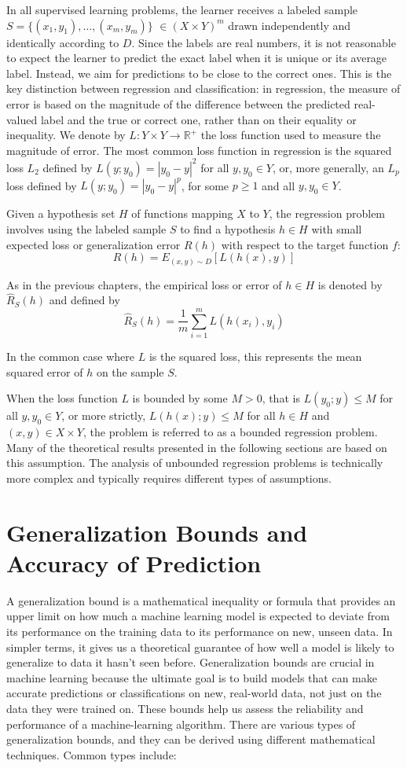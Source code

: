 \documentclass[fleqn,10pt]{olplainarticle}
\begin{document}
In all supervised learning problems, the learner receives a labeled sample $S = \{(x_1, y_1), \ldots, (x_m, y_m)\}$ \( \in (X \times Y)^m \) drawn independently and identically according to $D$. Since the labels are real numbers, it is not reasonable to expect the learner to predict the exact label when it is unique or its average label. Instead, we aim for predictions to be close to the correct ones. This is the key distinction between regression and classification: in regression, the measure of error is based on the magnitude of the difference between the predicted real-valued label and the true or correct one, rather than on their equality or inequality. We denote by $L: Y \times Y \to \mathbb{R}^+$ the loss function used to measure the magnitude of error. The most common loss function in regression is the squared loss $L_2$ defined by $L(y; y_0) = |y_0 - y|^2$ for all $y, y_0 \in Y$, or, more generally, an $L_p$ loss defined by $L(y; y_0) = |y_0 - y|^p$, for some $p \geq 1$ and all $y, y_0 \in Y$.

Given a hypothesis set $H$ of functions mapping $X$ to $Y$, the regression problem involves using the labeled sample $S$ to find a hypothesis $h \in H$ with small expected loss or generalization error $R(h)$ with respect to the target function $f$:
\[R(h) = E_{(x,y) \sim D} \left[L\left(h(x), y\right)\right]\]

As in the previous chapters, the empirical loss or error of $h \in H$ is denoted by $\hat{R}_S(h)$ and defined by
\[\hat{R}_S(h) = \frac{1}{m} \sum_{i=1}^m L\left(h(x_i), y_i\right)\]

In the common case where $L$ is the squared loss, this represents the mean squared error of $h$ on the sample $S$.

When the loss function $L$ is bounded by some $M > 0$, that is $L(y_0; y) \leq M$ for all $y, y_0 \in Y$, or more strictly, $L(h(x); y) \leq M$ for all $h \in H$ and $(x, y) \in X \times Y$, the problem is referred to as a bounded regression problem. Many of the theoretical results presented in the following sections are based on this assumption. The analysis of unbounded regression problems is technically more complex and typically requires different types of assumptions.


\section{Generalization Bounds and Accuracy of Prediction}

A generalization bound is a mathematical inequality or formula that provides an upper limit on how much a machine learning model is expected to deviate from its performance on the training data to its performance on new, unseen data. In simpler terms, it gives us a theoretical guarantee of how well a model is likely to generalize to data it hasn't seen before. Generalization bounds are crucial in machine learning because the ultimate goal is to build models that can make accurate predictions or classifications on new, real-world data, not just on the data they were trained on. These bounds help us assess the reliability and performance of a machine-learning algorithm. There are various types of generalization bounds, and they can be derived using different mathematical techniques. Common types include:
\end{document}
